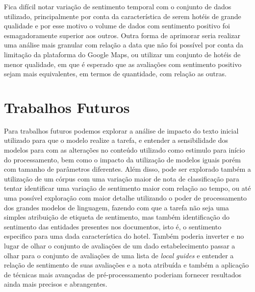 Fica difícil notar variação de sentimento temporal com o conjunto de dados utilizado, principalmente por conta da característica de serem hotéis de grande qualidade e por esse motivo o volume de dados com sentimento positivo foi esmagadoramente superior aos outros. Outra forma de aprimorar seria realizar uma análise mais granular com relação a data que não foi possível por conta da limitação da plataforma do Google Maps, ou utilizar um conjunto de hotéis de menor qualidade, em que é esperado que as avaliações com sentimento positivo sejam mais equivalentes, em termos de quantidade, com relação as outras.

\section{Trabalhos Futuros}
\label{cap:conclusao:sec:trab_futuros}

Para trabalhos futuros podemos explorar a análise de impacto do texto inicial utilizado para que o modelo realize a tarefa, e entender a sensibilidade dos modelos para com as alterações no conteúdo utilizado como estimulo para início do processamento, bem como o impacto da utilização de modelos iguais porém com tamanho de parâmetros diferentes. Além disso, pode ser explorado também a utilização de um córpus com uma variação maior de nota de classificação para tentar identificar uma variação de sentimento maior com relação ao tempo, ou até uma possível exploração com maior detalhe utilizando o poder de processamento dos grandes modelos de linguagem, fazendo com que a tarefa não seja uma simples atribuição de etiqueta de sentimento, mas também identificação do sentimento das entidades presentes nos documentos, isto é, o sentimento especifico para uma dada característica do hotel. Também poderia inverter e no lugar de olhar o conjunto de avaliações de um dado estabelecimento passar a olhar para o conjunto de avaliações de uma lista de \textit{local guides} e entender a relação de sentimento de suas avaliações e a nota atribuída e também a aplicação de técnicas mais avançadas de pré-processamento poderiam fornecer resultados ainda mais precisos e abrangentes.
